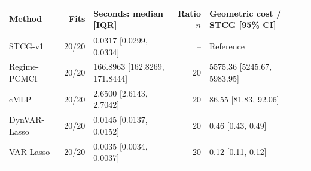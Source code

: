 \begin{tabular}{lrlrl}
\toprule
Method & Fits & Seconds: median [IQR] & Ratio $n$ & Geometric cost / STCG [95\% CI] \\
\midrule
STCG-v1 & 20/20 & 0.0317 [0.0299, 0.0334] & -- & Reference \\
Regime-PCMCI & 20/20 & 166.8963 [162.8269, 171.8444] & 20 & 5575.36 [5245.67, 5983.95] \\
cMLP & 20/20 & 2.6500 [2.6143, 2.7042] & 20 & 86.55 [81.83, 92.06] \\
DynVAR-Lasso & 20/20 & 0.0145 [0.0137, 0.0152] & 20 & 0.46 [0.43, 0.49] \\
VAR-Lasso & 20/20 & 0.0035 [0.0034, 0.0037] & 20 & 0.12 [0.11, 0.12] \\
\bottomrule
\end{tabular}
